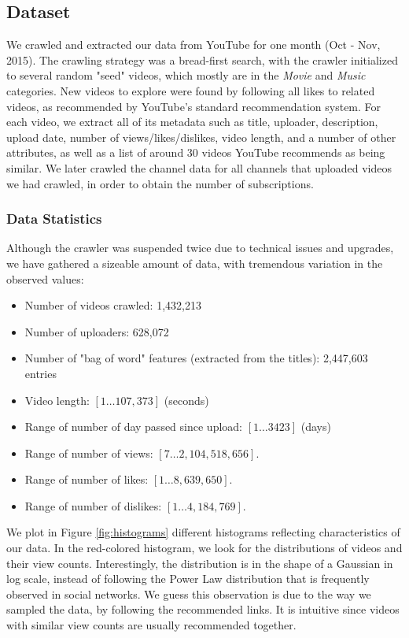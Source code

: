 \subsection{Dataset}
	We crawled and extracted our data from YouTube for one month (Oct - Nov, 2015). The crawling strategy was a bread-first search, with the crawler initialized to several random "seed" videos, which mostly are in the \textit{Movie} and \textit{Music} categories.  New videos to explore were found by following all likes to related videos, as recommended by YouTube's standard recommendation system. For each video, we extract all of its metadata such as title, uploader, description, upload date, number of views/likes/dislikes, video length, and a number of other attributes, as well as a list of around 30 videos YouTube recommends as being similar.  We later crawled the channel data for all channels that uploaded videos we had crawled, in order to obtain the number of subscriptions.

	\subsubsection{Data Statistics}
		Although the crawler was suspended twice due to technical issues and upgrades, we have gathered a sizeable amount of data, with tremendous variation in the observed values:
		
		\begin{itemize}
			\item Number of videos crawled: 1,432,213
			\item Number of uploaders: 628,072
			\item Number of "bag of word" features (extracted from the titles): 2,447,603 entries
			\item Video length: $[1 \ldots 107,373]$ (seconds)
			\item Range of number of day passed since upload: $[1 \ldots 3423]$ (days)
			\item Range of number of views: $[7 \ldots 2,104,518,656]$.
			\item Range of number of likes: $[1 \ldots 8,639,650]$.
			\item Range of number of dislikes: $[1 \ldots 4,184,769]$.
		\end{itemize}

		We plot in Figure \ref{fig:histograms} different histograms reflecting characteristics of our data. In the red-colored histogram, we look for the distributions of videos and their view counts. Interestingly, the distribution is in the shape of a Gaussian in log scale, instead of following the Power Law distribution that is frequently observed in social networks. We guess this observation is due to the way we sampled the data, by following the recommended links. It is intuitive since videos with similar view counts are usually recommended together. 
		
